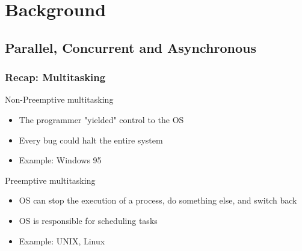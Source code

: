 \section{Background} %
\subsection{Parallel, Concurrent and Asynchronous}
\begin{frame}[fragile]
	\frametitle{Recap: Multitasking}
	{\color{red}Non-Preemptive multitasking}
	\begin{itemize}
		\item The programmer "yielded" control to the OS
		\item Every bug could halt the entire system
		\item Example: Windows 95
	\end{itemize}
	
	{\color{red}Preemptive multitasking}
	\begin{itemize}
		\item OS can stop the execution of a process, do something else, and switch back
		\item OS is responsible for scheduling tasks
		\item Example: UNIX, Linux
	\end{itemize}
\end{frame}

